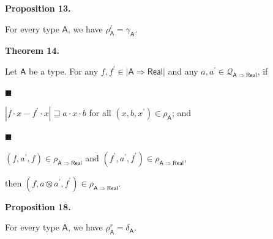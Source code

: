 \documentclass[10pt,a4paper]{amsart}
\begin{document}
 
\par\medskip\noindent\textbf{Proposition 13.}\par
 
 
For every type $\mathsf{A}$, we have $\rho^{l}_{{\mathsf{A}}}=\gamma_{\mathsf{A}}$.\par
 
 

 
\par\medskip\noindent\textbf{Theorem 14.}\par
 
 
Let $\mathsf{A}$ be a type. For any $f,f^{\prime}\in|\mathsf{A}\Rightarrow\mathsf{Real}|$ and any $a,a^{\prime}\in\mathcal{Q}_{\mathsf{A}\Rightarrow\mathsf{Real}}$, if\par
  
\par\noindent  $\blacksquare$ 
 
$|f\cdot x-f^{\prime}\cdot x|\sqsupseteq a\cdot x\cdot b$ for all $(x,b,x^{\prime})\in\rho_{\mathsf{A}}$; and\par
 
 
 
\par\noindent  $\blacksquare$ 
 
$(f,a^{\prime},f)\in\rho_{\mathsf{A}\Rightarrow\mathsf{Real}}$ and $(f^{\prime},a^{\prime},f^{\prime})\in\rho_{\mathsf{A}\Rightarrow\mathsf{Real}}$,\par
 
 
  
then $(f,a\otimes a^{\prime},f^{\prime})\in\rho_{\mathsf{A}\Rightarrow\mathsf{Real}}$.\par
 
 

 
\par\medskip\noindent\textbf{Proposition 18.}\par
 
 
For every type $\mathsf{A}$, we have $\rho_{\mathsf{A}}^{r}=\delta_{\mathsf{A}}$.\par
 
\end{document}
